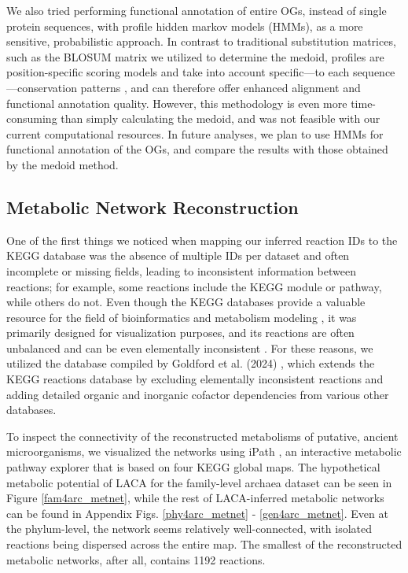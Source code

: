 We also tried performing functional annotation of entire OGs, instead of single protein sequences, with profile hidden markov models (HMMs), as a more sensitive, probabilistic approach. In contrast to traditional substitution matrices, such as the BLOSUM matrix \cite{henikoff1992} we utilized to determine the medoid, profiles are position-specific scoring models and take into account specific---to each sequence---conservation patterns \cite{mount2009, gribskov1987}, and can therefore offer enhanced alignment and functional annotation quality. However, this methodology is even more time-consuming than simply calculating the medoid, and was not feasible with our current computational resources. In future analyses, we plan to use HMMs for functional annotation of the OGs, and compare the results with those obtained by the medoid method.

\subsection*{Metabolic Network Reconstruction}


One of the first things we noticed when mapping our inferred reaction IDs to the KEGG database was the absence of multiple IDs per dataset and often incomplete or missing fields, leading to inconsistent information between reactions; for example, some reactions include the KEGG module or pathway, while others do not. Even though the KEGG databases provide a valuable resource for the field of bioinformatics and metabolism modeling \cite{kanehisa2000}, it was primarily designed for visualization purposes, and its reactions are often unbalanced \cite{wrzodek2013} and can be even elementally inconsistent \cite{goldford2024}. For these reasons, we utilized the database compiled by Goldford et al. (2024) \cite{goldford2024}, which extends the KEGG reactions database by excluding elementally inconsistent reactions and adding detailed organic and inorganic cofactor dependencies from various other databases. 

To inspect the connectivity of the reconstructed metabolisms of putative, ancient microorganisms, we visualized the networks using iPath \cite{darzi2018}, an interactive metabolic pathway explorer that is based on four KEGG global maps. The hypothetical metabolic potential of LACA for the family-level archaea dataset can be seen in Figure \ref{fam4arc_metnet}, while the rest of LACA-inferred metabolic networks can be found in Appendix Figs. \ref{phy4arc_metnet} - \ref{gen4arc_metnet}. Even at the phylum-level, the network seems relatively well-connected, with isolated reactions being dispersed across the entire map. The smallest of the reconstructed metabolic networks, after all, contains 1192 reactions. 

